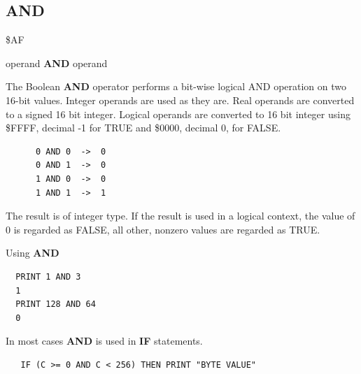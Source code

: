\subsection{AND}
\begin{description}[leftmargin=2cm,style=nextline]
\item [Token:] \$AF
\item [Format:] operand {\bf AND} operand
\item [Usage:]  The Boolean {\bf AND} operator performs a bit-wise
                logical AND operation on two 16-bit values.
                Integer operands are used as they are.
                Real operands are converted to a signed 16 bit integer.
                Logical operands are converted to 16 bit integer
                using \$FFFF, decimal -1 for TRUE
                and \$0000, decimal 0, for FALSE.

   \begin{verbatim}
      0 AND 0  ->  0
      0 AND 1  ->  0
      1 AND 0  ->  0
      1 AND 1  ->  1
   \end{verbatim}

\item [Remarks:] The result is of integer type.
                 If the result is used in a logical context,
                 the value of 0 is regarded as FALSE,
                 all other, nonzero values are regarded as TRUE.
\item [Example:] Using {\bf AND}

\begin{tcolorbox}[colback=black,coltext=white]
\verbatimfont{\codefont}
\begin{verbatim}
  PRINT 1 AND 3
  1
  PRINT 128 AND 64
  0
\end{verbatim}
\end{tcolorbox}

In most cases {\bf AND} is used in {\bf IF} statements.

\begin{tcolorbox}[colback=black,coltext=white]
\verbatimfont{\codefont}
\begin{verbatim}
   IF (C >= 0 AND C < 256) THEN PRINT "BYTE VALUE"
\end{verbatim}
\end{tcolorbox}
\end{description}


\newpage
